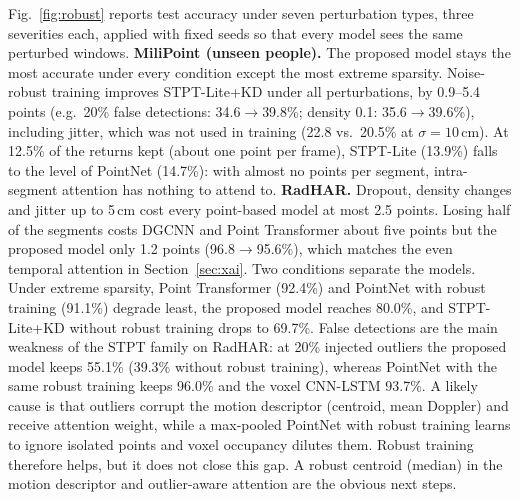 Fig.~\ref{fig:robust} reports test accuracy under seven perturbation types,
three severities each, applied with fixed seeds so that every model sees the
same perturbed windows. \textbf{MiliPoint (unseen people).} The proposed model
stays the most accurate under every condition except the most extreme
sparsity. Noise-robust training improves STPT-Lite+KD under all perturbations,
by 0.9--5.4 points (e.g.\ 20\% false detections: 34.6$\rightarrow$39.8\%; density
0.1: 35.6$\rightarrow$39.6\%), including jitter, which was not used in training
(22.8 vs.\ 20.5\% at $\sigma=10$\,cm). At 12.5\% of the returns kept (about one
point per frame), STPT-Lite (13.9\%) falls to the level of PointNet (14.7\%): with
almost no points per segment, intra-segment attention has nothing to attend to.
\textbf{RadHAR.} Dropout, density changes and jitter up to 5\,cm cost every
point-based model at most 2.5 points. Losing half of the segments costs DGCNN and
Point Transformer about five points but the proposed model only 1.2 points
(96.8$\rightarrow$95.6\%), which matches the even temporal attention in
Section~\ref{sec:xai}. Two conditions separate the
models. Under extreme sparsity, Point Transformer (92.4\%) and PointNet with
robust training (91.1\%) degrade least, the proposed model reaches 80.0\%, and
STPT-Lite+KD without robust training drops to 69.7\%. False detections are the
main weakness of the STPT family on RadHAR: at 20\% injected outliers the
proposed model keeps 55.1\% (39.3\% without robust training), whereas PointNet
with the same robust training keeps 96.0\% and the voxel CNN-LSTM 93.7\%.
A likely cause is that outliers corrupt the motion descriptor (centroid, mean Doppler) and receive
attention weight, while a max-pooled PointNet with robust training learns to
ignore isolated points and voxel occupancy dilutes them. Robust training
therefore helps, but it does not close this gap. A robust centroid (median) in
the motion descriptor and outlier-aware attention are the obvious next steps.
